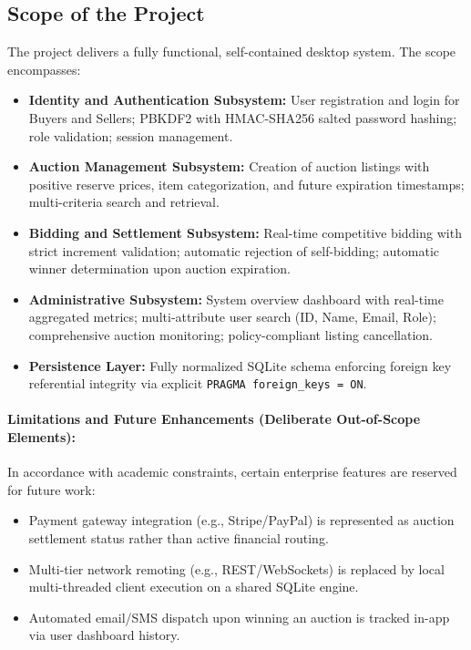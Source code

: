 \subsection{Scope of the Project}
The project delivers a fully functional, self-contained desktop system. The scope encompasses:
\begin{itemize}
    \item \textbf{Identity and Authentication Subsystem:} User registration and login for Buyers and Sellers; PBKDF2 with HMAC-SHA256 salted password hashing; role validation; session management.
    \item \textbf{Auction Management Subsystem:} Creation of auction listings with positive reserve prices, item categorization, and future expiration timestamps; multi-criteria search and retrieval.
    \item \textbf{Bidding and Settlement Subsystem:} Real-time competitive bidding with strict increment validation; automatic rejection of self-bidding; automatic winner determination upon auction expiration.
    \item \textbf{Administrative Subsystem:} System overview dashboard with real-time aggregated metrics; multi-attribute user search (ID, Name, Email, Role); comprehensive auction monitoring; policy-compliant listing cancellation.
    \item \textbf{Persistence Layer:} Fully normalized SQLite schema enforcing foreign key referential integrity via explicit \texttt{PRAGMA foreign\_keys = ON}.
\end{itemize}

\paragraph{Limitations and Future Enhancements (Deliberate Out-of-Scope Elements):}
In accordance with academic constraints, certain enterprise features are reserved for future work:
\begin{itemize}[noitemsep]
    \item Payment gateway integration (e.g., Stripe/PayPal) is represented as auction settlement status rather than active financial routing.
    \item Multi-tier network remoting (e.g., REST/WebSockets) is replaced by local multi-threaded client execution on a shared SQLite engine.
    \item Automated email/SMS dispatch upon winning an auction is tracked in-app via user dashboard history.
\end{itemize}

